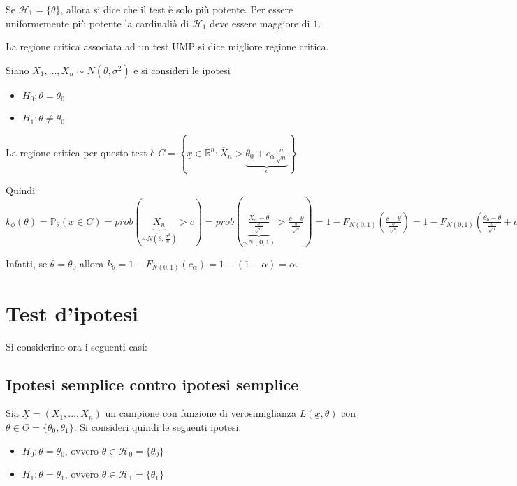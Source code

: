 \documentclass[hidelinks, 10pt]{report}
\begin{document}
\begin{defn}
Se $ \mathcal{H}_{1} = \{ \theta \} $, allora si dice che il test \`e solo pi\`u potente. Per essere uniformemente pi\`u potente la cardinali\`a di $ \mathcal{H}_{1} $ deve essere maggiore di $ 1 $.
\end{defn}

\begin{defn}
La regione critica associata ad un test UMP si dice migliore regione critica.
\end{defn}

\begin{es}
Siano $ X_{1}, \dotsc, X_{n} \sim N(\theta, \sigma^{2}) $ e si consideri le ipotesi
\begin{itemize}
\item $ H_{0}: \theta = \theta_{0} $
\item $ H_{1}: \theta \ne \theta_{0} $
\end{itemize}

La regione critica per questo test \`e $ C = \left\{ \underline{x} \in \mathbb{R}^{n} : \overline{X}_{n} > \underbrace{\theta_{0} + c_{\alpha} \frac{\sigma}{\sqrt{n}}}_{c} \right\} $.

Quindi $ k_{\phi} (\theta) = \mathbb{P}_{\theta} (\underline{x} \in C) = prob(\underbrace{\overline{X}_{n}}_{\sim N \left( \theta, \frac{\sigma^{2}}{n} \right) } > c) = prob \left( \underbrace{\frac{\overline{X}_{n} - \theta}{\frac{\sigma}{\sqrt{n}}}}_{\sim N(0,1)} > \frac{c - \theta}{\frac{\sigma}{\sqrt{n}}} \right) = 1 - F_{N(0,1)} \left( \frac{c - \theta}{\frac{\sigma}{\sqrt{n}}} \right) = 1 - F_{N(0,1)} \left( \frac{\theta_{0} - \theta}{\frac{\sigma}{\sqrt{n}}} + c_{\alpha} \right) $


Infatti, se $ \theta = \theta_{0} $ allora $ k_{\theta} = 1 - F_{N(0,1)} (c_{\alpha}) = 1 - (1 - \alpha) = \alpha $.
\end{es}

\section{Test d'ipotesi}
Si considerino ora i seguenti casi:

\subsection{Ipotesi semplice contro ipotesi semplice}
Sia $ \underline{X} = (X_{1}, \dotsc, X_{n}) $ un campione con funzione di verosimiglianza $ L(\underline{x}, \theta) $ con $ \theta \in \Theta = \{ \theta_{0}, \theta_{1} \} $.
Si consideri quindi le seguenti ipotesi:
\begin{itemize}
\item $ H_{0}: \theta = \theta_{0} $, ovvero $ \theta \in \mathcal{H}_{0} = \{ \theta_{0} \} $
\item $ H_{1}: \theta = \theta_{1} $, ovvero $ \theta \in \mathcal{H}_{1} = \{ \theta_{1} \} $
\end{itemize}
\end{document}

